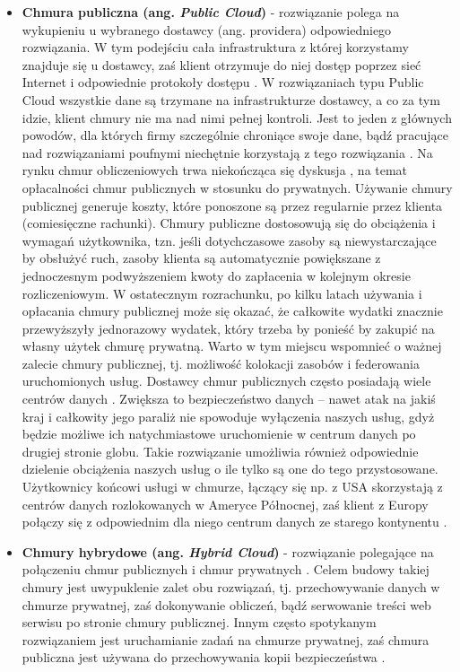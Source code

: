 \documentclass[10pt,a4paper,titlepage,twoside]{report}
\begin{document}
\begin{itemize}
	\item \textbf{Chmura publiczna (ang. \textit{Public Cloud})} - rozwiązanie polega na wykupieniu u wybranego dostawcy (ang. providera) odpowiedniego rozwiązania. W tym podejściu cała infrastruktura z której korzystamy znajduje się u dostawcy, zaś klient otrzymuje do niej dostęp poprzez sieć Internet i odpowiednie protokoły dostępu \cite{ad12}. W rozwiązaniach typu Public Cloud wszystkie dane są trzymane na infrastrukturze dostawcy, a co za tym idzie, klient chmury nie ma nad nimi pełnej kontroli. Jest to jeden z głównych powodów, dla których firmy szczególnie chroniące swoje dane, bądź pracujące nad rozwiązaniami poufnymi niechętnie korzystają z tego rozwiązania \cite{ad11}. Na rynku chmur obliczeniowych trwa niekończąca się dyskusja \cite{ad13}, na temat opłacalności chmur publicznych w stosunku do prywatnych. Używanie chmury publicznej generuje koszty, które ponoszone są przez regularnie przez klienta (comiesięczne rachunki). Chmury publiczne dostosowują się do obciążenia i wymagań użytkownika, tzn. jeśli dotychczasowe zasoby są niewystarczające by obsłużyć ruch, zasoby klienta są automatycznie powiększane z jednoczesnym podwyższeniem kwoty do zapłacenia w kolejnym okresie rozliczeniowym. W ostatecznym rozrachunku, po kilku latach używania i opłacania chmury publicznej może się okazać, że całkowite wydatki znacznie przewyższyły jednorazowy wydatek, który trzeba by ponieść by zakupić na własny użytek chmurę prywatną. Warto w tym miejscu wspomnieć o ważnej zalecie chmury publicznej, tj. możliwość kolokacji zasobów i federowania uruchomionych usług. Dostawcy chmur publicznych często posiadają wiele centrów danych \cite{ad11}. Zwiększa to bezpieczeństwo danych – nawet atak na jakiś kraj i całkowity jego paraliż nie spowoduje wyłączenia naszych usług, gdyż będzie możliwe ich natychmiastowe uruchomienie w centrum danych po drugiej stronie globu. Takie rozwiązanie umożliwia również odpowiednie dzielenie obciążenia naszych usług o ile tylko są one do tego przystosowane. Użytkownicy końcowi usługi w chmurze, łączący się np. z USA skorzystają z centrów danych rozlokowanych w Ameryce Północnej, zaś klient z Europy połączy się z odpowiednim dla niego centrum danych ze starego kontynentu \cite{ad11}.
	\item \textbf{Chmury hybrydowe (ang. \textit{Hybrid Cloud})} - rozwiązanie polegające na połączeniu chmur publicznych i chmur prywatnych \cite{ad13}. Celem budowy takiej chmury jest uwypuklenie zalet obu rozwiązań, tj. przechowywanie danych w chmurze prywatnej, zaś dokonywanie obliczeń, bądź serwowanie treści web serwisu po stronie chmury publicznej. Innym często spotykanym rozwiązaniem jest uruchamianie zadań na chmurze prywatnej, zaś chmura publiczna jest używana do przechowywania kopii bezpieczeństwa \cite{ad13}.
\end{itemize}
\end{document}
